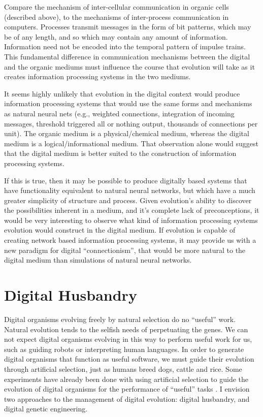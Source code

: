 Compare the mechanism of inter-cellular communication in organic cells
(described above), to the mechanisms of inter-process communication in
computers.  Processes transmit messages in the form of bit patterns,
which may be of any length, and so which may contain any amount of
information.  Information need not be encoded into the temporal pattern
of impulse trains.  This fundamental difference in communication
mechanisms between the digital and the organic mediums must influence
the course that evolution will take as it creates information processing
systems in the two mediums.

It seems highly unlikely that evolution in the digital context would
produce information processing systems that would use the same forms
and mechanisms as natural neural nets (e.g., weighted connections,
integration of incoming messages, threshold triggered all or nothing
output, thousands of connections per unit).  The organic medium is a
physical/chemical medium, whereas the digital medium is a
logical/informational medium.  That observation alone would suggest
that the digital medium is better suited to the construction of
information processing systems.

If this is true, then it may be possible to produce digitally based
systems that have functionality equivalent to natural neural networks,
but which have a much greater simplicity of structure and process.
Given evolution's ability to discover the possibilities inherent in a
medium, and it's complete lack of preconceptions, it would be very
interesting to observe what kind of information processing systems
evolution would construct in the digital medium.  If evolution is
capable of creating network based information processing systems, it
may provide us with a new paradigm for digital ``connectionism'',
that would be more natural to the digital medium than simulations of
natural neural networks.

\section{Digital Husbandry}

Digital organisms evolving freely by natural selection do no ``useful''
work.  Natural evolution tends to the selfish needs of perpetuating
the genes.  We can not expect digital organisms evolving in this way
to perform useful work for us, such as guiding robots or interpreting
human languages.  In order to generate digital organisms that
function as useful software, we must guide their evolution through
artificial selection, just as humans breed dogs, cattle and rice.
Some experiments have already been done with using artificial selection
to guide the evolution of digital organisms for the performance of
``useful'' tasks \cite{Adam,Surk,Tack}.  I envision two approaches to
the management of digital evolution: digital husbandry, and digital
genetic engineering.

